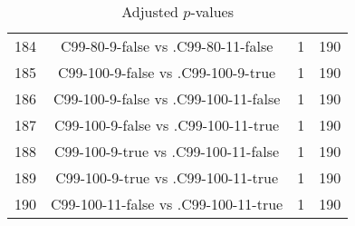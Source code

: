 \documentclass[a4paper,10pt]{article}
\begin{document}
\begin{landscape}
\begin{table}[!htp]
\begin{tabular}{cccc}
184&C99-80-9-false vs .C99-80-11-false&1&190\\
185&C99-100-9-false vs .C99-100-9-true&1&190\\
186&C99-100-9-false vs .C99-100-11-false&1&190\\
187&C99-100-9-false vs .C99-100-11-true&1&190\\
188&C99-100-9-true vs .C99-100-11-false&1&190\\
189&C99-100-9-true vs .C99-100-11-true&1&190\\
190&C99-100-11-false vs .C99-100-11-true&1&190\\
\hline
\end{tabular}
\caption{Adjusted $p$-values}
\end{table}

\end{landscape}
\end{document}
